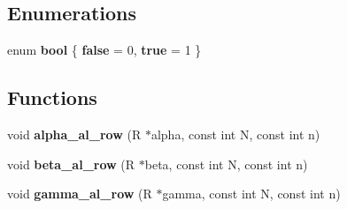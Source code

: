 \subsection*{Enumerations}
\begin{DoxyCompactItemize}
\item 
enum {\bfseries bool} \{ {\bfseries false} = 0, 
{\bfseries true} = 1
 \}
\end{DoxyCompactItemize}
\subsection*{Functions}
\begin{DoxyCompactItemize}
\item 
\hypertarget{group__nfsft_ga579cd4224a1b91605551f9ef36c02570}{void {\bfseries alpha\-\_\-al\-\_\-row} (R $\ast$alpha, const int N, const int n)}\label{group__nfsft_ga579cd4224a1b91605551f9ef36c02570}

\item 
\hypertarget{group__nfsft_ga701e714a76a30130d1db3394ef199b7a}{void {\bfseries beta\-\_\-al\-\_\-row} (R $\ast$beta, const int N, const int n)}\label{group__nfsft_ga701e714a76a30130d1db3394ef199b7a}

\item 
\hypertarget{group__nfsft_gacc014bf577397cff2b508de22a4581bb}{void {\bfseries gamma\-\_\-al\-\_\-row} (R $\ast$gamma, const int N, const int n)}\label{group__nfsft_gacc014bf577397cff2b508de22a4581bb}


\end{DoxyCompactItemize}

